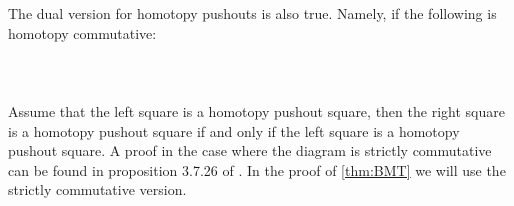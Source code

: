 \documentclass[a4paper]{article}
\begin{document}
The dual version for homotopy pushouts is also true. Namely, if the following is homotopy commutative: 
 \\~\\  \\~\\
Assume that the left square is a homotopy pushout square, then the right square is a homotopy pushout square if and only if the left square is a homotopy pushout square. A proof in the case where the diagram is strictly commutative can be found in proposition 3.7.26 of \cite{CHT}. In the proof of \ref{thm:BMT} we will use the strictly commutative version. 
\end{document}
